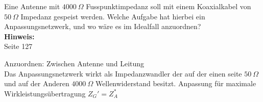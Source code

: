 \begin{question}[section=11,name={Anpassungsnetzwerk},difficulty=,quantity=1,type=thr,tags={}]
	Eine Antenne mit $4000 ~\Omega$  Fusspunktimpedanz soll mit einem Koaxialkabel von $50 ~\Omega$ Impedanz gespeist werden. Welche Aufgabe hat hierbei ein Anpassungsnetzwerk, und wo wäre es im Idealfall anzuordnen?
	\\ \textbf{Hinweis:}\\
	Seite 127
\end{question}
\begin{solution}
	Anzuordnen: Zwischen Antenne und Leitung\\
	Das Anpassungsnetzwerk wirkt als Impedanzwandler der auf der einen seite $50~\Omega$ und auf der Anderen $4000~\Omega$ Wellenwiderstand besitzt. Anpassung für maximale Wirkleistungsübertragung $Z_G' =Z_A^*$
	
\end{solution}